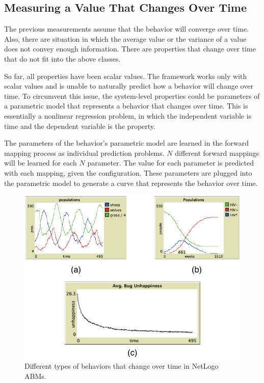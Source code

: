 \subsection{Measuring a Value That Changes Over Time}
The previous measurements assume that the behavior will converge over time.
Also, there are situation in which the average value or the variance of a value does not convey enough information.
There are properties that change over time that do not fit into the above classes.

So far, all properties have been scalar values.
The framework works only with scalar values and is unable to naturally predict how a behavior will change over time.
To circumvent this issue, the system-level properties could be parameters of a parametric model that represents a behavior that changes over time.
This is essentially a nonlinear regression problem, in which the independent variable is time and the dependent variable is the property.

The parameters of the behavior's parametric model are learned in the forward mapping process as individual prediction problems.
$N$ different forward mappings will be learned for each $N$ parameter.
The value for each parameter is predicted with each mapping, given the configuration.
These parameters are plugged into the parametric model to generate a curve that represents the behavior over time.

\begin{figure}[ht]
\centering
\includegraphics{images/overtime_compare.pdf}
\caption{Different types of behaviors that change over time in NetLogo ABMs. }
\label{fig:overtime_compare}
\end{figure}


